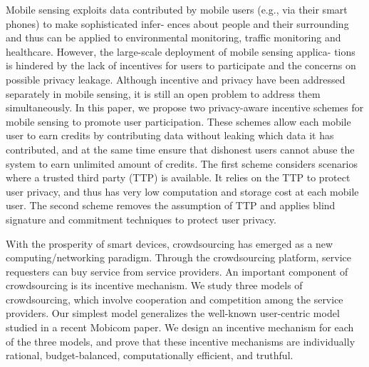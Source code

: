 \documentclass{sig-alternate}
\begin{document}
Mobile sensing exploits data contributed by mobile users (e.g., via their smart phones) to make sophisticated infer- ences about people and their surrounding and thus can be applied to environmental monitoring, traffic monitoring and healthcare. However, the large-scale deployment of mobile sensing applica- tions is hindered by the lack of incentives for users to participate and the concerns on possible privacy leakage. Although incentive and privacy have been addressed separately in mobile sensing, it is still an open problem to address them simultaneously. In this paper, we propose two privacy-aware incentive schemes for mobile sensing to promote user participation. These schemes allow each mobile user to earn credits by contributing data without leaking which data it has contributed, and at the same time ensure that dishonest users cannot abuse the system to earn unlimited amount of credits. The first scheme considers scenarios where a trusted third party (TTP) is available. It relies on the TTP to protect user privacy, and thus has very low computation and storage cost at each mobile user. The second scheme removes the assumption of TTP and applies blind signature and commitment techniques to protect user privacy. \cite{li2013providing}

With the prosperity of smart devices, crowdsourcing has emerged as a new computing/networking paradigm. Through the crowdsourcing platform, service requesters can buy service from service providers. An important component of crowdsourcing is its incentive mechanism. We study three models of crowdsourcing, which involve cooperation and competition among the service providers. Our simplest model generalizes the well-known user-centric model studied in a recent Mobicom paper. We design an incentive mechanism for each of the three models, and prove that these incentive mechanisms are individually rational, budget-balanced, computationally efficient, and truthful. \cite{7218676}
\end{document}
